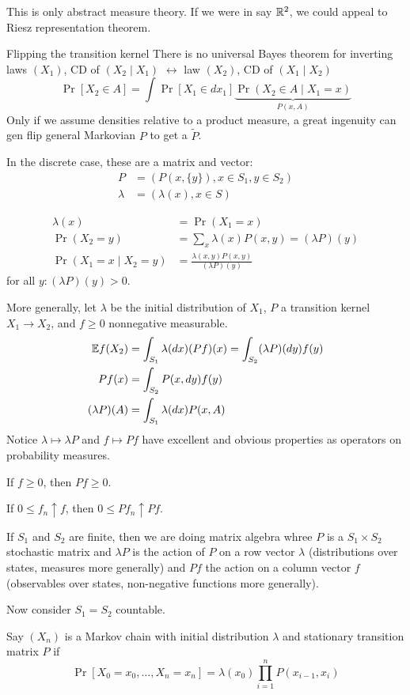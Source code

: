 \begin{remark}
  This is only abstract measure theory.
  If we were in say $\mathbb{R}^2$, we could appeal to Riesz representation theorem.
\end{remark}

\begin{note}{Flipping the transition kernel}
  There is no universal Bayes theorem for inverting laws $(X_1)$,
  CD of $(X_2 \mid X_1)$ $\leftrightarrow$ law $(X_2)$, CD of $(X_1 \mid X_2)$
  \[
    \Pr[X_2 \in A] = \int \Pr[X_1 \in dx_1] \underbrace{\Pr(X_2 \in A \mid X_1 = x)}_{P(x, A)}
  \]
  Only if we assume densities relative to a product measure, a great
  ingenuity can gen flip general Markovian $P$ to
  get a $\tilde{P}$.

  In the discrete case, these are a matrix and vector:
  \begin{align}
    P &= (P(x,\{y\}), x \in S_1, y \in S_2) \\
    \lambda &= (\lambda(x), x \in S)
  \end{align}

  \begin{align}
    \lambda(x) &= \Pr(X_1 = x) \\
    \Pr(X_2 = y) &= \sum_x \lambda(x) P(x, y) = (\lambda P)(y) \\
    \Pr(X_1 = x \mid X_2 = y) &= \frac{\lambda(x, y) P(x, y)}{(\lambda P)(y)}
  \end{align}
  for all $y : (\lambda P)(y) > 0$.
\end{note}

More generally, let $\lambda$ be the initial distribution of $X_1$,
$P$ a transition kernel $X_1 \to X_2$,
and $f \geq 0$ nonnegative measurable.
\begin{align*}
  \mathbb{E} f(X_2) &= \int_{S_1} \lambda(dx) (P f)(x) = \int_{S_2} (\lambda P)(dy) f(y) \\
  P f(x) &= \int_{S_2} P(x, dy) f(y) \\
  (\lambda P)(A) &= \int_{S_1} \lambda(d x) P(x, A)
\end{align*}
Notice $\lambda \mapsto \lambda P$ and $f \mapsto P f$ have excellent
and obvious properties as operators on probability measures.

\begin{example}
  If $f \geq 0$, then $P f \geq 0$.

  If $0 \leq f_n \uparrow f$, then $0 \leq P f_n \uparrow P f$.
\end{example}

If $S_1$ and $S_2$ are finite, then we are doing matrix algebra whree
$P$ is a $S_1 \times S_2$ stochastic matrix and
$\lambda P$ is the action of $P$ on a row vector $\lambda$ (distributions
over states, measures more generally)
and $P f$ the action on a column vector $f$ (observables over states,
non-negative functions more generally).

Now consider $S_1 = S_2$ countable.
\begin{definition}
  Say $(X_n)$ is a Markov chain with initial distribution
  $\lambda$ and stationary transition matrix $P$ if
  \[
    \Pr[X_0 = x_0, \ldots, X_n = x_n]
    = \lambda(x_0) \prod_{i=1}^n P(x_{i-1}, x_i)
  \]
\end{definition}
